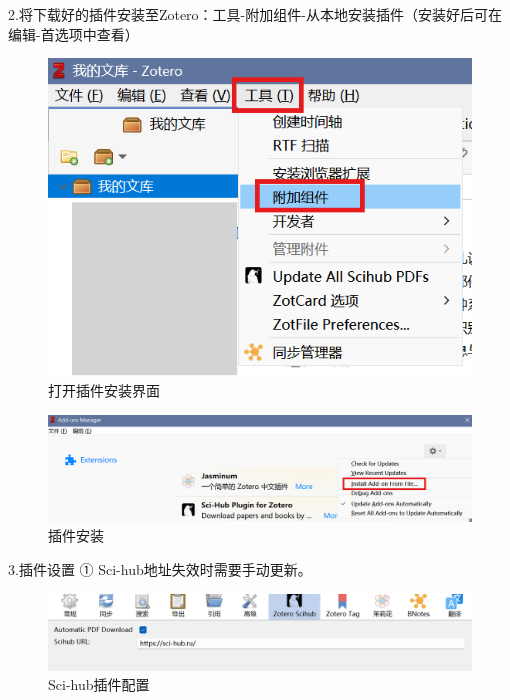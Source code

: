 \documentclass[]{ctexbook}
\theoremstyle{definition}
\theoremstyle{definition}
\theoremstyle{definition}
\theoremstyle{definition}
\theoremstyle{remark}
\begin{document}
2.将下载好的插件安装至Zotero：工具-附加组件-从本地安装插件（安装好后可在编辑-首选项中查看）

\begin{figure}

{\centering \includegraphics[width=1\linewidth]{img/zotero-cite-cn/plugins_install_1} 

}

\caption{打开插件安装界面}\label{fig:plugins-install-interface}
\end{figure}

\begin{figure}

{\centering \includegraphics[width=1\linewidth]{img/zotero-cite-cn/plugins_install_2} 

}

\caption{插件安装}\label{fig:plugins-install}
\end{figure}

3.插件设置
① Sci-hub地址失效时需要手动更新。

\begin{figure}

{\centering \includegraphics[width=1\linewidth]{img/zotero-cite-cn/plugins_Scihub_setting} 

}

\caption{Sci-hub插件配置}\label{fig:plugins-Scihub-setting}
\end{figure}
\end{document}
